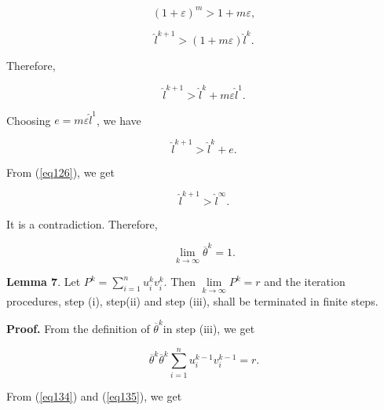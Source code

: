 \documentclass [18pt]{article}
\begin{document}
\begin{equation}
\label{eq129}
(1 + \varepsilon )^m > 1 + m\varepsilon ,
\end{equation}




\begin{equation}
\label{eq130}
\widehat{l}^{k + 1} > (1 + m\varepsilon )\widehat{l}^k.
\end{equation}



Therefore,


\begin{equation}
\label{eq131}
\widehat{l}^{k + 1} > \widehat{l}^k + m\varepsilon \widehat{l}^1.
\end{equation}



Choosing $e = m\varepsilon \widehat{l}^1$, we have


\begin{equation}
\label{eq132}
\widehat{l}^{k + 1} > \widehat{l}^k + e.
\end{equation}



From (\ref{eq126}), we get


\begin{equation}
\label{eq133}
\widehat{l}^{k + 1} > \widehat{l}^\infty .
\end{equation}



It is a contradiction. Therefore,


\begin{equation}
\label{eq134}
\mathop {\lim }\limits_{k \to \infty } \overline \theta ^k = 1.
\end{equation}



\textbf{Lemma 7}. Let $P^k = \sum\limits_{i = 1}^n {u_i^k } v_i^k $. Then
$\mathop {\lim }\limits_{k \to \infty } P^k = r$ and the iteration
procedures, step (i), step(ii) and step (iii), shall be terminated in finite
steps.

\textbf{Proof.} From the definition of $\overline \theta ^k$in step (iii),
we get


\begin{equation}
\label{eq135}
\overline \theta ^k\overline \theta ^k\sum\limits_{i = 1}^n {u_i^{k - 1} }
v_i^{k - 1} = r.
\end{equation}



From (\ref{eq134}) and (\ref{eq135}), we get
\end{document}
